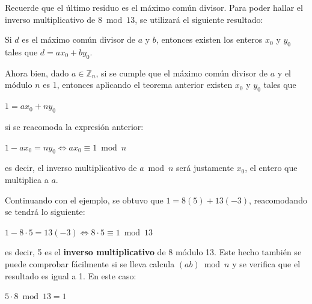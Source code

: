 Recuerde que el \'ultimo residuo es el m\'aximo com\'un divisor. Para poder
hallar el inverso multiplicativo de $8 \bmod 13$, se utilizar\'a el 
siguiente resultado:
\begin{theorem}
Si $d$ es el m\'aximo com\'un divisor de $a$ y $b$, entonces existen los
enteros $x_0$ y $y_0$ tales que $d=ax_0+by_0$.
\end{theorem}
Ahora bien, dado $a \in \mathbb{Z}_n$, si se cumple que el m\'aximo com\'un divisor de $a$ y el m\'odulo $n$
es 1, entonces aplicando el teorema anterior
 existen $x_0$ y $y_0$ tales  que
\begin{center}
$1=ax_0+ny_0$ 
\end{center}
si se reacomoda la expresi\'on anterior:
\begin{center}
  $1-ax_0=ny_0 \Longleftrightarrow ax_0 \equiv 1 \bmod n$\\ [5mm] 
\end{center} 
es decir, el inverso multiplicativo de $a \bmod n$ ser\'a justamente
$x_0$, el entero que multiplica a $a$. 

Continuando con el ejemplo, se obtuvo que $1=8(5)+13(-3)$, reacomodando
se tendr\'a lo siguiente:
\begin{center}
$1-8 \cdot 5=13(-3) \Longleftrightarrow 8\cdot 5 \equiv 1 \bmod 13$
\end{center}
es decir, 5 es el {\bf inverso multiplicativo} de 8 m\'odulo 13. Este 
hecho tambi\'en se puede comprobar f\'acilmente si se lleva calcula 
$(ab) \bmod n$ y se verifica que el resultado es igual a 1. En este
caso: 
\begin{center}
$5 \cdot 8 \bmod 13= 1$
\end{center} 


